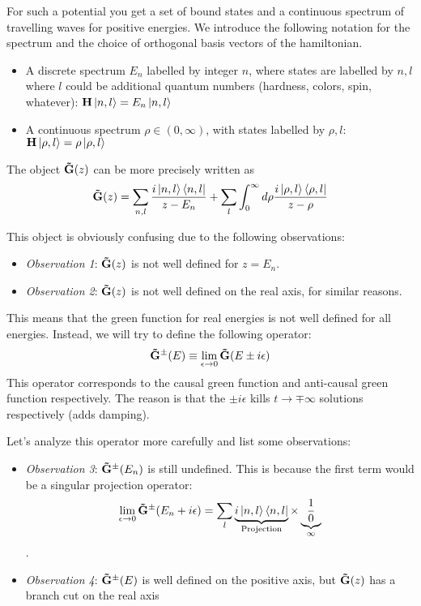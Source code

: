 \documentclass[11pt]{article}
\theoremstyle{definition}
\begin{document}
For such a potential you get a set of bound states and a continuous spectrum of travelling waves for positive energies.  We introduce the following notation for the spectrum and the choice of orthogonal basis vectors of the hamiltonian.
\begin{itemize}
\item A discrete spectrum $E_n$ labelled by integer $n$, where states are labelled by $n, l$  where $l$ could be additional quantum numbers (hardness, colors, spin, whatever): $ \mathbf{H} \ket{n, l} = E_n \ket{n, l}$ 
\item A continuous spectrum $\rho \in (0, \infty)$, with states labelled by $\rho, l$:  $\mathbf{H} \ket{\rho, l} = \rho \ket{\rho, l}$
\end{itemize}

The object $\mathbf{\tilde{G}} (z)$ can be more precisely written as
\begin{align}
\mathbf{\tilde{G}}(z) = \sum_{n, l} {i \ket{n, l} \bra{n, l} \over z - E_n} + \sum_l \int_{0}^\infty d\rho {i \ket{\rho, l} \bra{\rho, l} \over z - \rho}
\end{align}

This object is obviously confusing due to the following observations:
\begin{itemize}
\item \emph{Observation 1}: $\mathbf{\tilde{G}}(z)$ is not well defined for $z = E_n$.  
\item \emph{Observation 2}: $\mathbf{\tilde{G}}(z)$ is not well defined on the real axis, for similar reasons.
\end{itemize}

This means that the green function for real energies is not well defined for all energies.  Instead, we will try to define the following operator:
\begin{align}
\mathbf{\tilde{G}}^\pm(E) \equiv \lim_{\epsilon \rightarrow 0} \mathbf{\tilde{G}}(E \pm i \epsilon)
\end{align}
This operator corresponds to the causal green function and anti-causal green function respectively.  The reason is that the $\pm i \epsilon$ kills $ t \rightarrow \mp \infty$ solutions respectively (adds damping).
 
Let's analyze this operator more carefully and list some observations:
\begin{itemize}
\item \emph{Observation 3}: $\mathbf{\tilde{G}}^\pm(E_n)$ is still undefined.  This is because the first term would be a singular projection operator:
$$\lim_{\epsilon \rightarrow 0}\mathbf{\tilde{G}}^\pm(E_n + i \epsilon) = \sum_l \underbrace{{i \ket{n, l} \bra{n, l}}}_{\text{Projection}} \times \underbrace{{1 \over 0}}_{\infty}$$.
\item \emph{Observation 4}: $\mathbf{\tilde{G}}^\pm(E)$ is well defined on the positive axis, but $\mathbf{\tilde{G}}(z)$ has a branch cut on the real axis
\end{itemize}
\end{document}
